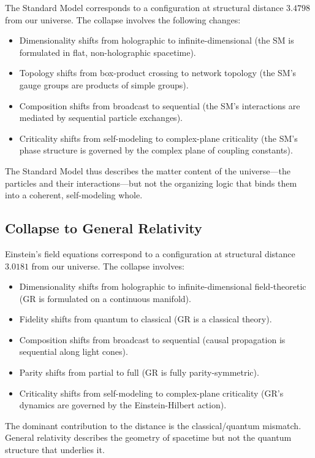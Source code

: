 \documentclass[11pt,a4paper]{article}
\theoremstyle{definition}
\begin{document}
The Standard Model corresponds to a configuration at structural distance \(3.4798\) from our universe. The collapse involves the following changes:

\begin{itemize}
    \item Dimensionality shifts from holographic to infinite-dimensional (the SM is formulated in flat, non-holographic spacetime).
    \item Topology shifts from box-product crossing to network topology (the SM's gauge groups are products of simple groups).
    \item Composition shifts from broadcast to sequential (the SM's interactions are mediated by sequential particle exchanges).
    \item Criticality shifts from self-modeling to complex-plane criticality (the SM's phase structure is governed by the complex plane of coupling constants).
\end{itemize}

The Standard Model thus describes the matter content of the universe---the particles and their interactions---but not the organizing logic that binds them into a coherent, self-modeling whole.

\subsection{Collapse to General Relativity}

Einstein's field equations correspond to a configuration at structural distance \(3.0181\) from our universe. The collapse involves:

\begin{itemize}
    \item Dimensionality shifts from holographic to infinite-dimensional field-theoretic (GR is formulated on a continuous manifold).
    \item Fidelity shifts from quantum to classical (GR is a classical theory).
    \item Composition shifts from broadcast to sequential (causal propagation is sequential along light cones).
    \item Parity shifts from partial to full (GR is fully parity-symmetric).
    \item Criticality shifts from self-modeling to complex-plane criticality (GR's dynamics are governed by the Einstein-Hilbert action).
\end{itemize}

The dominant contribution to the distance is the classical/quantum mismatch. General relativity describes the geometry of spacetime but not the quantum structure that underlies it.
\end{document}
